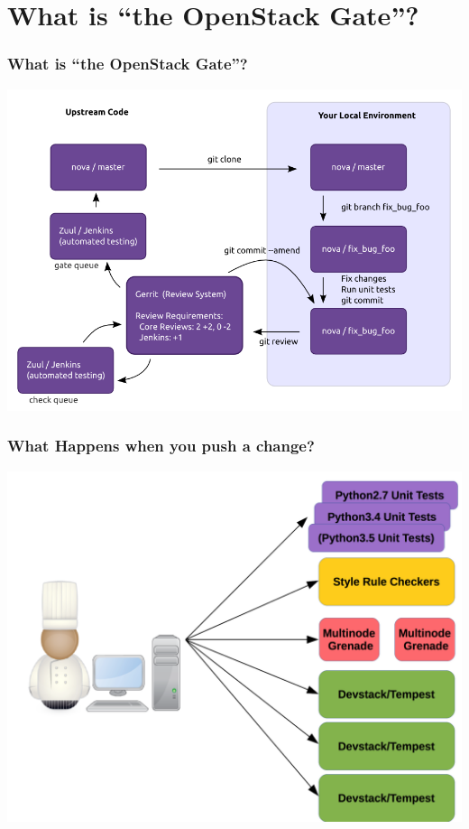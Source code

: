 \documentclass[aspectratio=43,11pt,hyperref={colorlinks=true}]{beamer}
\begin{document}
\section{What is ``the OpenStack Gate''?}
\begin{frame}
    \frametitle{What is ``the OpenStack Gate''?}
	\begin{center}
		\includegraphics[width=.85\textwidth]{code_review.png}
	\end{center}
\end{frame}

\begin{frame}
\frametitle{What Happens when you push a change?}
\begin{center}
	\includegraphics[width=.7\textwidth]{jobs.png}
\end{center}
\end{frame}
\end{document}
